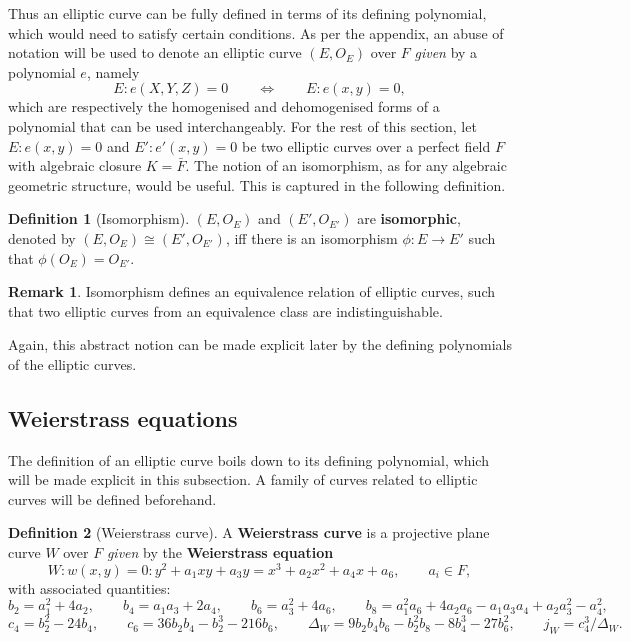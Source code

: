 \documentclass{article}
\newcommand{\rb}[1]{\left( #1 \right)}
\theoremstyle{definition}\newtheorem*{definition}{Definition}
\theoremstyle{definition}\newtheorem*{example}{Example}
\theoremstyle{definition}\newtheorem*{remark}{Remark}
\begin{document}
Thus an elliptic curve can be fully defined in terms of its defining polynomial, which would need to satisfy certain conditions. As per the appendix, an abuse of notation will be used to denote an elliptic curve $ \rb{E, O_E} $ over $ F $ \emph{given} by a polynomial $ e $, namely
$$ E : e\rb{X, Y, Z} = 0 \qquad \iff \qquad E : e\rb{x, y} = 0, $$
which are respectively the homogenised and dehomogenised forms of a polynomial that can be used interchangeably. For the rest of this section, let $ E : e\rb{x, y} = 0 $ and $ E' : e'\rb{x, y} = 0 $ be two elliptic curves over a perfect field $ F $ with algebraic closure $ K = \bar{F} $. The notion of an isomorphism, as for any algebraic geometric structure, would be useful. This is captured in the following definition.

\begin{definition}[Isomorphism]
$ \rb{E, O_E} $ and $ \rb{E', O_{E'}} $ are \textbf{isomorphic}, denoted by $ \rb{E, O_E} \cong \rb{E', O_{E'}} $, iff there is an isomorphism $ \phi : E \to E' $ such that $ \phi\rb{O_E} = O_{E'} $.
\end{definition}

\begin{remark}
Isomorphism defines an equivalence relation of elliptic curves, such that two elliptic curves from an equivalence class are indistinguishable.
\end{remark}

Again, this abstract notion can be made explicit later by the defining polynomials of the elliptic curves.

\pagebreak

\subsection{Weierstrass equations}

The definition of an elliptic curve boils down to its defining polynomial, which will be made explicit in this subsection. A family of curves related to elliptic curves will be defined beforehand.

\begin{definition}[Weierstrass curve]
A \textbf{Weierstrass curve} is a projective plane curve $ W $ over $ F $ \emph{given} by the \textbf{Weierstrass equation}
$$ W : w\rb{x, y} = 0 : y^2 + a_1xy + a_3y = x^3 + a_2x^2 + a_4x + a_6, \qquad a_i \in F, $$
with associated quantities:
$$ b_2 = a_1^2 + 4a_2, \qquad b_4 = a_1a_3 + 2a_4, \qquad b_6 = a_3^2 + 4a_6, \qquad b_8 = a_1^2a_6 + 4a_2a_6 - a_1a_3a_4 + a_2a_3^2 - a_4^2, $$
$$ c_4 = b_2^2 - 24b_4 , \qquad c_6 = 36b_2b_4 - b_2^3 - 216b_6, \qquad \Delta_W = 9b_2b_4b_6 - b_2^2b_8 - 8b_4^3 - 27b_6^2, \qquad j_W = c_4^3 / \Delta_W. $$
\end{definition}
\end{document}
